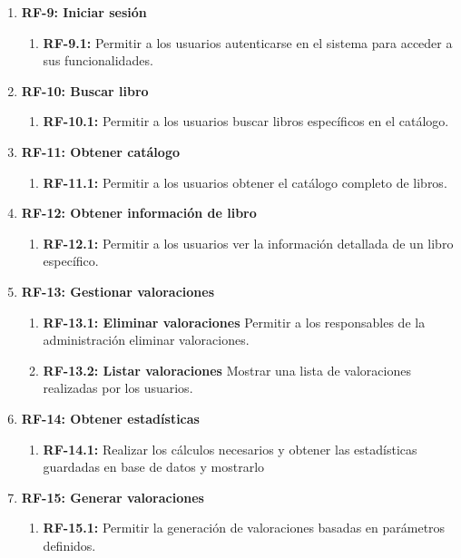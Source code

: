 \begin{enumerate}
    \item \textbf{RF-9: Iniciar sesión}
    \begin{enumerate}
        \item \textbf{RF-9.1:} Permitir a los usuarios autenticarse en el sistema para acceder a sus funcionalidades.
    \end{enumerate}

    \item \textbf{RF-10: Buscar libro}
    \begin{enumerate}
        \item \textbf{RF-10.1:} Permitir a los usuarios buscar libros específicos en el catálogo.
    \end{enumerate}

    \item \textbf{RF-11: Obtener catálogo}
    \begin{enumerate}
        \item \textbf{RF-11.1:} Permitir a los usuarios obtener el catálogo completo de libros.
    \end{enumerate}

    \item \textbf{RF-12: Obtener información de libro}
    \begin{enumerate}
        \item \textbf{RF-12.1:} Permitir a los usuarios ver la información detallada de un libro específico.
    \end{enumerate}
    
    \item \textbf{RF-13: Gestionar valoraciones}
    \begin{enumerate}
        \item \textbf{RF-13.1: Eliminar valoraciones} Permitir a los responsables de la administración eliminar valoraciones.
        \item \textbf{RF-13.2: Listar valoraciones} Mostrar una lista de valoraciones realizadas por los usuarios.
    \end{enumerate}

    \item \textbf{RF-14: Obtener estadísticas}
    \begin{enumerate}
        \item \textbf{RF-14.1:} Realizar los cálculos necesarios y obtener las estadísticas guardadas en base de datos y mostrarlo
    \end{enumerate}

    \item \textbf{RF-15: Generar valoraciones}
    \begin{enumerate}
        \item \textbf{RF-15.1:} Permitir la generación de valoraciones basadas en parámetros definidos.
    \end{enumerate}


\end{enumerate}
